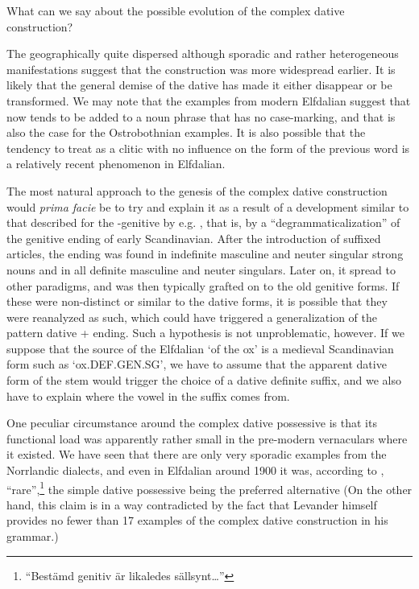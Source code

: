 What can we say about the possible evolution of the complex dative construction? 

The geographically quite dispersed although sporadic and rather heterogeneous manifestations suggest that the construction was more widespread earlier. It is likely that the general demise of the dative has made it either disappear or be transformed. We may note that the examples from modern Elfdalian suggest that now tends to be added to a noun phrase that has no case-marking, and that is also the case for the Ostrobothnian examples. It is also possible that the tendency to treat  as a clitic with no influence on the form of the previous word is a relatively recent phenomenon in Elfdalian.  

The most natural approach to the genesis of the complex dative construction would \textit{prima facie} be to try and explain it as a result of a development similar to that described for the -genitive by e.g. \citet{Norde1997}, that is, by a “degrammaticalization” of the genitive ending of early Scandinavian. After the introduction of suffixed articles, the ending was found in indefinite masculine and neuter singular strong nouns and in all definite masculine and neuter singulars. Later on, it spread to other paradigms, and was then typically grafted on to the old genitive forms. If these were non-distinct or similar to the dative forms, it is possible that they were reanalyzed as such, which could have triggered a generalization of the pattern dative + ending. Such a hypothesis is not unproblematic, however. If we suppose that the source of the Elfdalian  ‘of the ox’ is a medieval Scandinavian form such as  ‘ox.DEF.GEN.SG’, we have to assume that the apparent dative form of the stem would trigger the choice of a dative definite suffix, and we also have to explain where the vowel in the suffix comes from. 

One peculiar circumstance around the complex dative possessive is that its functional load was apparently rather small in the pre-modern vernaculars where it existed. We have seen that there are only very sporadic examples from the Norrlandic dialects, and even in Elfdalian around 1900 it was, according to \citet[98-99]{Levander1909}, “rare”,\footnote{ “Bestämd genitiv är likaledes sällsynt…”} the simple dative possessive being the preferred alternative (On the other hand, this claim is in a way contradicted by the fact that Levander himself provides no fewer than 17 examples of the complex dative construction in his grammar.) 

